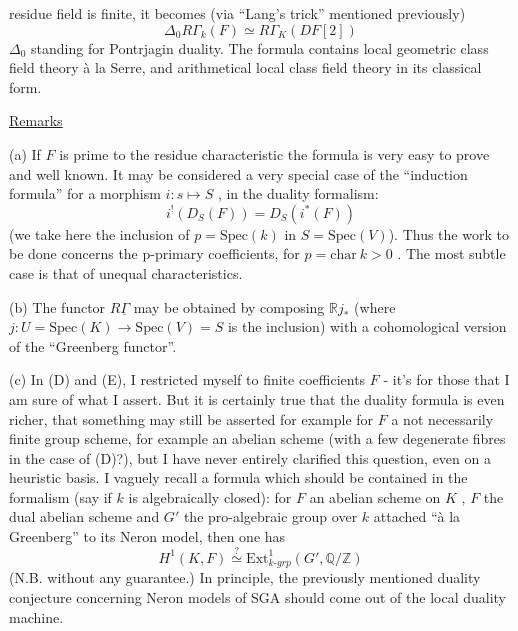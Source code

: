 
residue field is finite, it becomes (via ``Lang's trick'' mentioned previously)
\[ \Delta_0 R\Gamma_k(F) \simeq R\Gamma_K(DF[2]) \]
$\Delta_0$ standing for Pontrjagin duality. The formula contains local geometric
class field theory à la Serre, and arithmetical local class field theory
in its classical form.

\uline{Remarks}

(a) If $F$ is prime to the residue characteristic the formula is very
easy to prove and well known. It may be considered a very special case of
the ``induction formula'' for a morphism $i : s \longmapsto S$ , in the duality
formalism:
\[ i^!(D_S(F)) = D_S(i^*(F)) \]
(we take here the inclusion of $p = \mathrm{Spec}(k)$ in $S = \mathrm{Spec}(V)$). Thus the
work to be done concerns the p-primary coefficients, for $p = \mathrm{char}\ k > 0$ .
The most subtle case is that of unequal characteristics.

(b) The functor $R\underline{\Gamma}$ may be obtained by composing $\mathbb{R}j_*$ (where
$j : U = \mathrm{Spec}(K) \longrightarrow \mathrm{Spec}(V) = S$ is the inclusion) with a cohomological
version of the ``Greenberg functor''.

(c) In (D) and (E), I restricted myself to finite coefficients $F$ - it's
for those that I am sure of what I assert. But it is certainly true that
the duality formula is even richer, that something may still be asserted
for example for $F$ a not necessarily finite group scheme, for example an
abelian scheme (with a few degenerate fibres in the case of (D)?), but
I have never entirely clarified this question, even on a heuristic basis.
I vaguely recall a formula which should be contained in the formalism (say
if $k$ is algebraically closed): for $F$ an abelian scheme on $K$ , $F$
the dual abelian scheme and $G'$ the pro-algebraic group over $k$ attached
``à la Greenberg'' to its Neron model, then one has
\[ H^1(K, F) \overset{?}{\simeq} \mathrm{Ext}^1_{k\text{-}grp}(G', \mathbb{Q}/\mathbb{Z}) \]
(N.B. without any guarantee.) In principle, the previously mentioned duality
conjecture concerning Neron models of SGA should come out of the local
duality machine.
 
